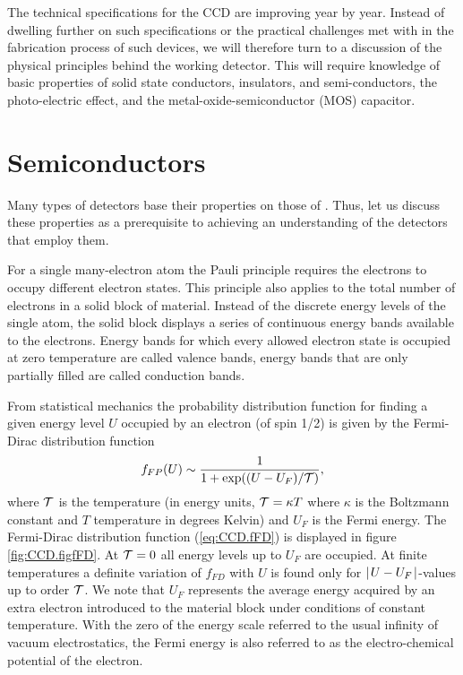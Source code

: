 The technical specifications for the CCD are improving year by
year. Instead of dwelling further on such specifications or the
practical challenges met with in the fabrication process of such
devices, we will therefore turn to a discussion of the physical
principles behind the working detector. This will require knowledge of
basic properties of solid state conductors, insulators, and
semi-conductors, the photo-electric effect, and the
metal-oxide-semiconductor (MOS) capacitor.

\section{Semiconductors}

Many types of detectors base their properties on those of {}. Thus, let us discuss these properties as a
prerequisite to achieving an understanding of the detectors that
employ them. 

For a single many-electron atom the Pauli principle requires the
electrons to occupy different electron states. This principle also
applies to the total number of electrons in a solid block of
material. Instead of the discrete energy levels of the single atom,
the solid block displays a series of continuous energy bands available
to the electrons. Energy bands for which every allowed electron state
is occupied at zero temperature are called valence bands, energy bands
that are only partially filled are called conduction bands. 

From statistical mechanics the probability distribution function for
finding a given energy level $U$ occupied by an electron (of spin 1/2)
is given by the Fermi-Dirac distribution function
\begin{equation}
  f_{FP}(U) \sim \frac{1}{1+\exp((U-U_F)/{\cal T})},
  \label{eq:CCD.fFD}
\end{equation}
where ${\cal T}$ is the temperature (in energy units, ${\cal T} = \kappa T$
where $\kappa$ is the Boltzmann constant and $T$ temperature in
degrees Kelvin) and $U_F$ is the Fermi energy. The Fermi-Dirac
distribution function (\ref{eq:CCD.fFD}) is displayed in figure
\ref{fig:CCD.figfFD}. At ${\cal T} = 0$ all energy levels up to $U_F$ are
occupied. At finite temperatures a definite variation of $f_{FD}$ with
$U$ is found only for $\mid\! U - U_F \!\mid$-values up to order ${\cal T}$. We note that $U_F$ represents the average energy acquired by an
extra electron introduced to the material block under conditions of
constant temperature. With the zero of the energy scale referred to the
usual infinity of vacuum electrostatics, the Fermi energy is also
referred to as the electro-chemical potential of the electron.

